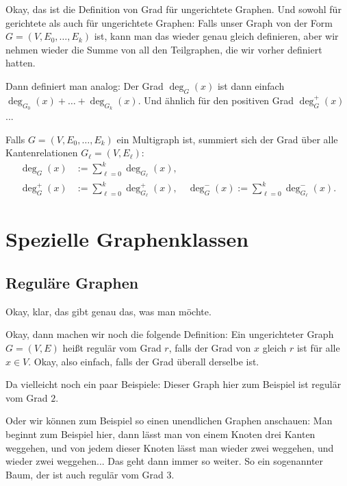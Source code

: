 \begin{spoken-clean}[00:47:17 - 00:49:17]
Okay, das ist die Definition von Grad für ungerichtete Graphen. Und sowohl für gerichtete als auch für ungerichtete Graphen: Falls unser Graph von der Form $G = (V, E_0, \dots, E_k)$ ist, kann man das wieder genau gleich definieren, aber wir nehmen wieder die Summe von all den Teilgraphen, die wir vorher definiert hatten.

Dann definiert man analog: Der Grad $\operatorname{deg}_G(x)$ ist dann einfach $\operatorname{deg}_{G_0}(x) + \dots + \operatorname{deg}_{G_k}(x)$. Und ähnlich für den positiven Grad $\operatorname{deg}_G^+(x)$...
\end{spoken-clean}

\begin{math-stroke}
Falls $G = (V, E_0, \dots, E_k)$ ein Multigraph ist, summiert sich der Grad über alle Kantenrelationen $G_\ell = (V, E_\ell)$:
\begin{align}
\operatorname{deg}_G(x) &:= \sum_{\ell=0}^k \operatorname{deg}_{G_\ell}(x), \label{eq:multigraph-grad-gesamte} \\
\operatorname{deg}_G^+(x) &:= \sum_{\ell=0}^k \operatorname{deg}_{G_\ell}^+(x), \quad \operatorname{deg}_G^-(x) := \sum_{\ell=0}^k \operatorname{deg}_{G_\ell}^-(x). \nonumber
\end{align}
\end{math-stroke}

\section{Spezielle Graphenklassen}

\subsection{Reguläre Graphen}

\begin{spoken-clean}[00:49:17 - 00:51:35]
Okay, klar, das gibt genau das, was man möchte.

Okay, dann machen wir noch die folgende Definition: Ein ungerichteter Graph $G = (V, E)$ heißt regulär vom Grad $r$, falls der Grad von $x$ gleich $r$ ist für alle $x \in V$. Okay, also einfach, falls der Grad überall derselbe ist.

Da vielleicht noch ein paar Beispiele: Dieser Graph hier zum Beispiel ist regulär vom Grad $2$.

Oder wir können zum Beispiel so einen unendlichen Graphen anschauen: Man beginnt zum Beispiel hier, dann lässt man von einem Knoten drei Kanten weggehen, und von jedem dieser Knoten lässt man wieder zwei weggehen, und wieder zwei weggehen... Das geht dann immer so weiter. So ein sogenannter Baum, der ist auch regulär vom Grad $3$.
\end{spoken-clean}

